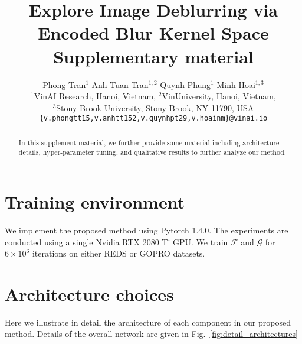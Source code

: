 \documentclass[final]{cvpr}
\newcommand{\Fref}[1]{Fig.~\ref{#1}}
\newcommand{\anh}[1]{{\textcolor{cyan}{[Anh: #1]}}}
\begin{document}
\title{Explore Image Deblurring via Encoded Blur Kernel Space\\
--- Supplementary material ---}

\author{
Phong Tran$^{1}$ \quad Anh Tuan Tran$^{1,2}$ \quad Quynh Phung$^{1}$ \quad Minh Hoai$^{1,3}$ \\
$^1$VinAI Research, Hanoi, Vietnam,
$^2$VinUniversity, Hanoi, Vietnam,\\
$^3$Stony Brook University, Stony Brook, NY 11790, USA\\
{\tt\small \{v.phongtt15,v.anhtt152,v.quynhpt29,v.hoainm\}@vinai.io}
}

\maketitle



\begin{abstract}
In this supplement material, we further provide some material including architecture details, hyper-parameter tuning, and qualitative results to further analyze our method.
\end{abstract}


\section{Training environment}
We implement the proposed method using Pytorch 1.4.0. The experiments are conducted using a single Nvidia RTX 2080 Ti GPU. We train $\mathcal{F}$ and $\mathcal{G}$ for $6 \times 10^6$ iterations on either REDS \cite{nah2019ntire} or GOPRO \cite{nah2017deep} datasets. 

\section{Architecture choices}
Here we illustrate in detail the architecture of each component in our proposed method. Details of the overall network are given in \Fref{fig:detail_architectures}
\end{document}
